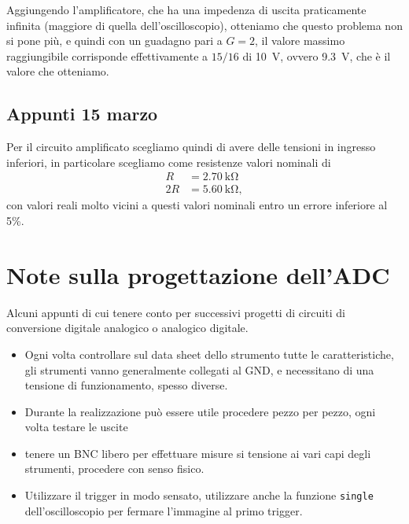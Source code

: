 \documentclass[
    rmp,
    reprint, 
    superscriptaddress, 
    altaffilletter, 
    amsmath, 
    amssymb, 
    a4paper]{revtex4-2}
\begin{document}
Aggiungendo l'amplificatore, che ha una impedenza di uscita praticamente infinita (maggiore di quella dell'oscilloscopio), otteniamo che questo problema non si pone più, e quindi con un guadagno pari a $G=2$, il valore massimo raggiungibile corrisponde effettivamente a $15/16$ di \SI{10}{\volt}, ovvero \SI{9.3}{\volt}, che è il valore che otteniamo.  

\subsection{Appunti 15 marzo}
Per il circuito amplificato scegliamo quindi di avere delle tensioni in ingresso inferiori, in particolare scegliamo come resistenze valori nominali di \begin{align*}
    R &= \SI{2.70}{\kilo\ohm}\\
    2R &= \SI{5.60}{\kilo\ohm},
\end{align*} con valori reali molto vicini a questi valori nominali entro un errore inferiore al 5\%.

\section{Note sulla progettazione dell'ADC}

Alcuni appunti di cui tenere conto per successivi progetti di circuiti di conversione digitale analogico o analogico digitale.

\begin{itemize}
    \item Ogni volta controllare sul data sheet dello strumento tutte le caratteristiche, gli strumenti vanno generalmente collegati al GND, e necessitano di una tensione di funzionamento, spesso diverse. 
    \item Durante la realizzazione può essere utile procedere pezzo per pezzo, ogni volta testare le uscite
    \item tenere un BNC libero per effettuare misure si tensione ai vari capi degli strumenti, procedere con senso fisico. 
    \item Utilizzare il trigger in modo sensato, utilizzare anche la funzione \verb-single- dell'oscilloscopio per fermare l'immagine al primo trigger.
\end{itemize}
    

\appendix

\setcounter{table}{0}
\renewcommand{\thetable}{A-\Roman{table}}
\end{document}
